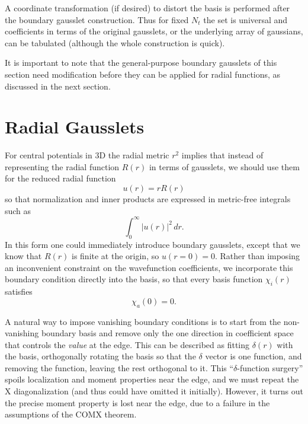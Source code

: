\documentclass[aps,pra,reprint,longbibliography,nofootinbib]{revtex4-2}
\begin{document}
A coordinate transformation (if desired) to distort the basis is performed after the boundary gausslet construction. Thus for fixed $N_t$ the set is universal and coefficients in terms of the original gausslets, or the underlying array of gaussians, can be tabulated (although the whole construction is quick).

It is important to note that the general-purpose boundary gausslets of this section need modification before they can be applied for radial functions, as discussed in the next section.


\section{Radial Gausslets}

For central potentials in 3D the radial metric $r^2$ implies that instead of representing the radial function $R(r)$ in terms of gausslets, we should use them for the reduced radial function
\begin{equation}
u(r) = r R(r)
\end{equation}
so that normalization and inner products are expressed in metric-free integrals such as 
\begin{equation}
\int_0^\infty |u(r)|^2\,dr.
\end{equation}
In this form one could immediately introduce boundary gausslets, except that we know that $R(r)$ is finite at the origin, so $u(r=0)=0$.  Rather than imposing an inconvenient constraint on the wavefunction coefficients, we incorporate this boundary condition directly into the basis, so that every basis function $\chi_i(r)$
satisfies
\begin{equation}
\chi_a(0) = 0.
\end{equation}

A natural way to impose vanishing boundary conditions is to start from the non-vanishing boundary basis and remove only the one direction in coefficient space that controls the \emph{value} at the edge. This can be described as fitting $\delta(r)$ with the basis, orthogonally rotating the basis so that the $\delta$ vector is one function, and removing the function, leaving  the rest orthogonal to it. This ``$\delta$-function surgery''
spoils localization and moment properties near the edge, and we must repeat the X diagonalization (and thus could have omitted it initially).   However, it turns out the precise moment property is lost near the edge, due to a failure in the assumptions of the COMX theorem.
\end{document}
